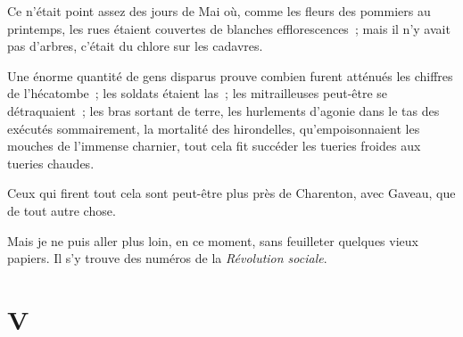 \documentclass[french,twoside]{book} %
\newcommand\chapteropen{} %
\newcommand\chapterclose{} %
\begin{document}
\noindent Ce n’était point assez des jours de Mai où, comme les fleurs des pommiers au printemps, les rues étaient couvertes de blanches efflorescences ; mais il n’y avait pas d’arbres, c’était du chlore sur les cadavres.\par
 Une énorme quantité de gens disparus prouve combien furent atténués les chiffres de l’hécatombe ; les soldats étaient las ; les mitrailleuses peut-être se détraquaient ; les bras sortant de terre, les hurlements d’agonie dans le tas des exécutés sommairement, la mortalité des hirondelles, qu’empoisonnaient les mouches de l’immense charnier, tout cela fit succéder les tueries froides aux tueries chaudes.\par
Ceux qui firent tout cela sont peut-être plus près de Charenton, avec Gaveau, que de tout autre chose.\par
Mais je ne puis aller plus loin, en ce moment, sans feuilleter quelques vieux papiers. Il s’y trouve des numéros de la \emph{Révolution sociale}.
\chapterclose


\chapteropen
 \chapter[{V}]{V}
\label{p2.5}
\end{document}
